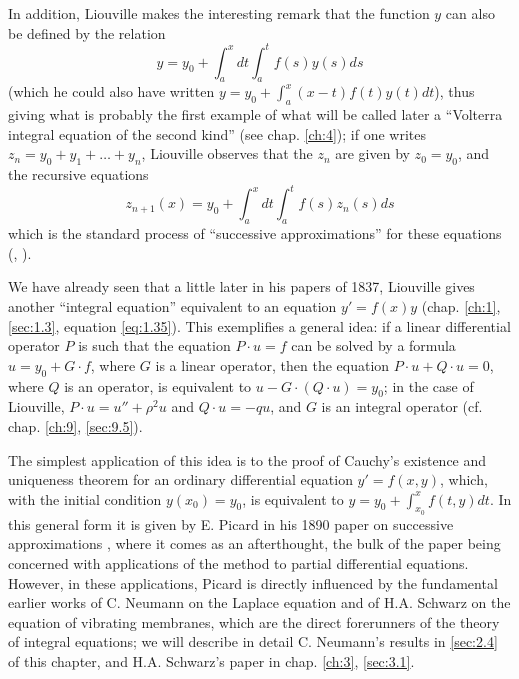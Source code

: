 \documentclass[12pt,a4paper,leqno,twoside]{extbook}
\begin{document}
In addition, Liouville makes the interesting remark that the function \(y\) can also be defined by the relation
\begin{equation}
    \label{eq:2.6}
    y = y_0 + \int_a^x dt \int_a^t f(s) y(s) ds
\end{equation}
(which he could also have written \(y = y_0 + \int_a^x (x-t)f(t)y(t)dt\)), thus giving what is probably the first example of what will be called later a ``Volterra integral equation of the second kind'' (see chap. \ref{ch:4}); if one writes \(z_n = y_0 + y_1 + \ldots + y_n\), Liouville observes that the \(z_n\) are given by \(z_0 = y_0\), and the recursive equations
\begin{equation}
    \label{eq:2.7}
    z_{n+1}(x) = y_0 + \int_a^x dt \int_a^t f(s) z_n(s) ds
\end{equation}
which is the standard process of ``successive approximations'' for these equations (\cite{151}, \cite[p.~268--281]{S}).

We have already seen that a little later in his papers of 1837, Liouville gives another ``integral equation'' equivalent to an equation \(y' = f(x)y\) (chap. \ref{ch:1}, \ref{sec:1.3}, equation \eqref{eq:1.35}). This exemplifies a general idea: if a linear differential operator \(P\) is such that the equation \(P \cdot u = f\) can be solved by a formula \(u = y_0 + G \cdot f\), where \(G\) is a linear operator, then the equation \(P \cdot u + Q \cdot u = 0\), where \(Q\) is an operator, is equivalent to \(u - G \cdot (Q \cdot u) = y_0\); in the case of Liouville, \(P \cdot u = u'' + \rho^2 u\) and \(Q \cdot u = -qu\), and \(G\) is an integral operator (cf. chap. \ref{ch:9}, \ref{sec:9.5}).

The simplest application of this idea is to the proof of Cauchy's existence and uniqueness theorem for an ordinary differential equation \(y' = f(x,y)\), which, with the initial condition \(y(x_0) = y_0\), is equivalent to \(y = y_0 + \int_{x_0}^x f(t,y)dt\). In this general form it is given by E. Picard in his 1890 paper on successive approximations \cite[vol.~II, p.~197--200]{172}, where it comes as an afterthought, the bulk of the paper being concerned with applications of the method to partial differential equations. However, in these applications, Picard is directly influenced by the fundamental earlier works of C. Neumann on the Laplace equation and of H.A. Schwarz on the equation of vibrating membranes, which are the direct forerunners of the theory of integral equations; we will describe in detail C. Neumann's results in \ref{sec:2.4} of this chapter, and H.A. Schwarz's paper in chap. \ref{ch:3}, \ref{sec:3.1}.
\end{document}
